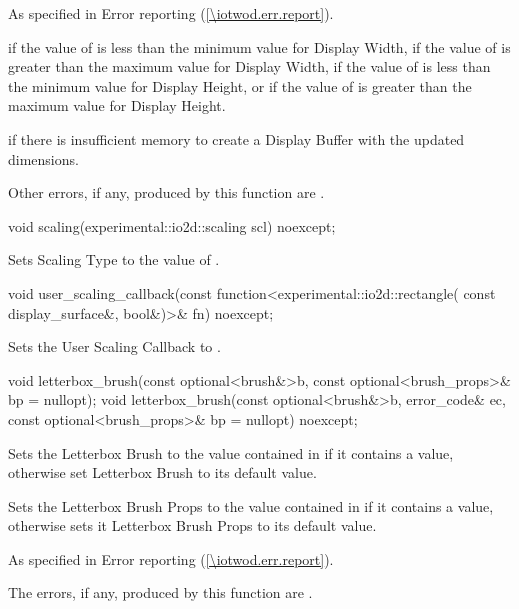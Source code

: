 \begin{itemdescr}
\pnum
\throws
As specified in Error reporting (\ref{\iotwod.err.report}).

\pnum
\errors
{} if the value of  is less than the minimum value for Display Width, if the value of  is greater than the maximum value for Display Width, if the value of  is less than the minimum value for Display Height, or if the value of  is greater than the maximum value for Display Height.

 if there is insufficient memory to create a Display Buffer with the updated dimensions.

Other errors, if any, produced by this function are .
\end{itemdescr}

\begin{itemdecl}
void scaling(experimental::io2d::scaling scl) noexcept;
\end{itemdecl}
\begin{itemdescr}
\pnum
\effects
Sets Scaling Type to the value of .
\end{itemdescr}

\begin{itemdecl}
void user_scaling_callback(const function<experimental::io2d::rectangle(
  const display_surface&, bool&)>& fn) noexcept;
\end{itemdecl}
\begin{itemdescr}
\pnum
\effects
Sets the User Scaling Callback to .
\end{itemdescr}

\begin{itemdecl}
void letterbox_brush(const optional<brush&>b,
  const optional<brush_props>& bp = nullopt);
void letterbox_brush(const optional<brush&>b, error_code& ec,
  const optional<brush_props>& bp = nullopt) noexcept;
\end{itemdecl}
\begin{itemdescr}
\pnum
\effects
Sets the Letterbox Brush to the value contained in  if it contains a value, otherwise set Letterbox Brush to its default value.

\pnum
Sets the Letterbox Brush Props to the value contained in  if it contains a value, otherwise sets it Letterbox Brush Props to its default value.

\pnum
\throws
As specified in Error reporting (\ref{\iotwod.err.report}).

\pnum
\errors
The errors, if any, produced by this function are .
\end{itemdescr}

